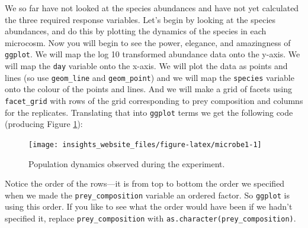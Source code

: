 \documentclass[]{book}
\makeatletter
\newenvironment{Shaded}{\begin{snugshade}}{\end{snugshade}}
\newcommand{\DataTypeTok}[1]{\textcolor[rgb]{0.13,0.29,0.53}{#1}}
\newcommand{\KeywordTok}[1]{\textcolor[rgb]{0.13,0.29,0.53}{\textbf{#1}}}
\newcommand{\NormalTok}[1]{#1}
\newcommand{\OperatorTok}[1]{\textcolor[rgb]{0.81,0.36,0.00}{\textbf{#1}}}
\newcommand{\StringTok}[1]{\textcolor[rgb]{0.31,0.60,0.02}{#1}}
\newenvironment{kframe}{%
\medskip{}
\setlength{\fboxsep}{.8em}
 \def\at@end@of@kframe{}%
 \ifinner\ifhmode%
  \def\at@end@of@kframe{\end{minipage}}%
  \begin{minipage}{\columnwidth}%
 \fi\fi%
 \def\FrameCommand##1{\hskip\@totalleftmargin \hskip-\fboxsep
 \colorbox{shadecolor}{##1}\hskip-\fboxsep
     \hskip-\linewidth \hskip-\@totalleftmargin \hskip\columnwidth}%
 \MakeFramed {\advance\hsize-\width
   \@totalleftmargin\z@ \linewidth\hsize
   \@setminipage}}%
 {\par\unskip\endMakeFramed%
 \at@end@of@kframe}
\newenvironment{rmdblock}[1]
  {
  \begin{itemize}
  \renewcommand{\labelitemi}{
    \raisebox{-.7\height}[0pt][0pt]{
      {\setkeys{Gin}{width=3em,keepaspectratio}\texttt{[image: images/\#1]}}
    }
  }
  \setlength{\fboxsep}{1em}
  \begin{kframe}
  \item
  }
  {
  \end{kframe}
  \end{itemize}
  }
\newenvironment{info}
  {\begin{rmdblock}{info}}
  {\end{rmdblock}}
\makeatother
\begin{document}
We so far have not looked at the species abundances and have not yet calculated the three required response variables. Let's begin by looking at the species abundances, and do this by plotting the dynamics of the species in each microcosm. Now you will begin to see the power, elegance, and amazingness of \texttt{ggplot}. We will map the log 10 transformed abundance data onto the y-axis. We will map the \texttt{day} variable onto the x-axis. We will plot the data as points and lines (so use \texttt{geom\_line} and \texttt{geom\_point}) and we will map the \texttt{species} variable onto the colour of the points and lines. And we will make a grid of facets using \texttt{facet\_grid} with rows of the grid corresponding to prey composition and columns for the replicates. Translating that into \texttt{ggplot} terms we get the following code (producing Figure \ref{fig:microbe1}):

\begin{Shaded}
\end{Shaded}

\begin{figure}

{\centering \texttt{[image: insights\_website\_files/figure-latex/microbe1-1]} 

}

\caption{Population dynamics observed during the experiment.}\label{fig:microbe1}
\end{figure}

\begin{info}
Notice the order of the rows---it is from top to bottom the order we
specified when we made the \texttt{prey\_composition} variable an
ordered factor. So \texttt{ggplot} is using this order. If you like to
see what the order would have been if we hadn't specified it, replace
\texttt{prey\_composition} with
\texttt{as.character(prey\_composition)}.
\end{info}
\end{document}
